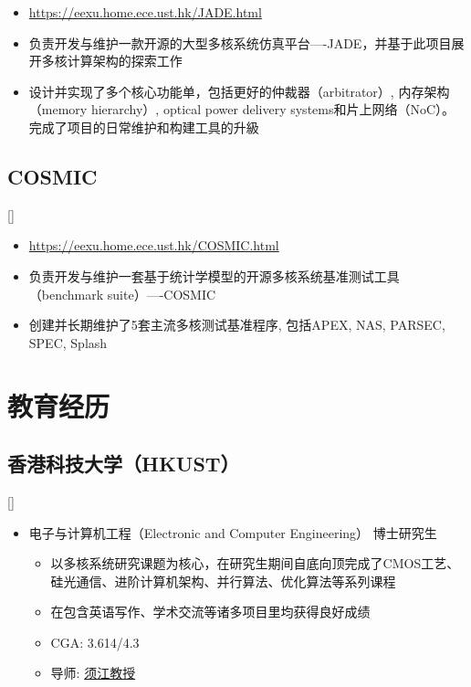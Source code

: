 \documentclass{mycv}
\begin{document}
\begin{itemize}
  \item \url{https://eexu.home.ece.ust.hk/JADE.html}
  \item 负责开发与维护一款开源的大型多核系统仿真平台----JADE，并基于此项目展开多核计算架构的探索工作
  \item 设计并实现了多个核心功能单，包括更好的仲裁器（arbitrator）, 内存架构（memory hierarchy）, optical power delivery systems和片上网络（NoC）。完成了项目的日常维护和构建工具的升級
\end{itemize}

\subsection{COSMIC}[]
\begin{positions}
\end{positions}

\begin{itemize}
	\item \url{https://eexu.home.ece.ust.hk/COSMIC.html}
	\item 负责开发与维护一套基于统计学模型的开源多核系统基准测试工具（benchmark suite）----COSMIC
	\item 创建并长期维护了5套主流多核测试基准程序, 包括APEX, NAS, PARSEC, SPEC, Splash
\end{itemize}

\section{教育经历}

\subsection{香港科技大学（HKUST）}[]
\vspace{-\parskip}%
\begin{itemize}[label={}]
	\item 电子与计算机工程（Electronic and Computer Engineering） 博士研究生 
	\begin{itemize}[label=\textbullet]
		\item 以多核系统研究课题为核心，在研究生期间自底向顶完成了CMOS工艺、硅光通信、进阶计算机架构、并行算法、优化算法等系列课程
		\item 在包含英语写作、学术交流等诸多项目里均获得良好成绩
		\item CGA: 3.614/4.3
		\item 导师: \href{https://eexu.home.ece.ust.hk/}{须江教授}
	\end{itemize}
\end{itemize}
\end{document}

